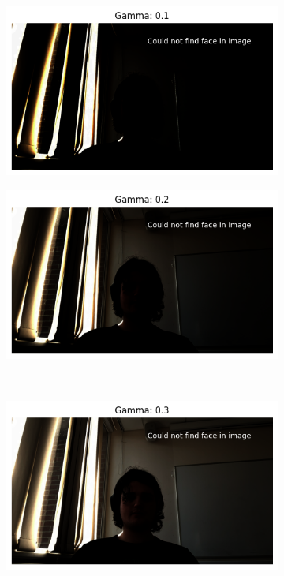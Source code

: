 \documentclass{report}
\begin{document}
\begin{figure}[h]
    \centering
    \begin{subfigure}{0.4\textwidth}
      \centering
      \includegraphics[width=\linewidth]{../assets/lighting-experiment/gamma-0.1.png}
    \end{subfigure}%
    \begin{subfigure}{0.4\textwidth}
      \centering
      \includegraphics[width=\linewidth]{../assets/lighting-experiment/gamma-0.2.png}
    \end{subfigure}\\[1em]
    \begin{subfigure}{0.4\textwidth}
      \centering
      \includegraphics[width=\linewidth]{../assets/lighting-experiment/gamma-0.3.png}

\end{subfigure}
\end{figure}
\end{document}
